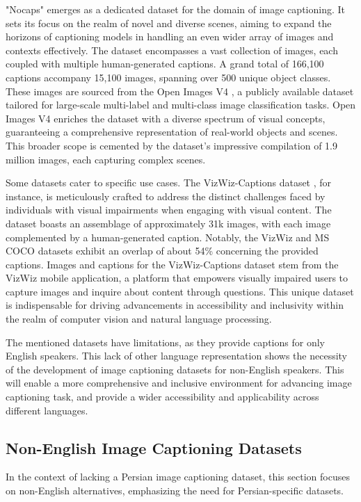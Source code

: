 \documentclass[runningheads]{llncs}
\begin{document}
"Nocaps" \cite{Nocaps} emerges as a dedicated dataset for the domain of image captioning. It sets its focus on the realm of novel and diverse scenes, aiming to expand the horizons of captioning models in handling an even wider array of images and contexts effectively. The dataset encompasses a vast collection of images, each coupled with multiple human-generated captions. A grand total of 166,100 captions accompany 15,100 images, spanning over 500 unique object classes. These images are sourced from the Open Images V4 \cite{Openimages}, a publicly available dataset tailored for large-scale multi-label and multi-class image classification tasks. Open Images V4 enriches the dataset with a diverse spectrum of visual concepts, guaranteeing a comprehensive representation of real-world objects and scenes. This broader scope is cemented by the dataset's impressive compilation of 1.9 million images, each capturing complex scenes.

Some datasets cater to specific use cases. The VizWiz-Captions dataset \cite{VizWiz}, for instance, is meticulously crafted to address the distinct challenges faced by individuals with visual impairments when engaging with visual content. The dataset boasts an assemblage of approximately 31k images, with each image complemented by a human-generated caption. Notably, the VizWiz and MS COCO datasets exhibit an overlap of about 54\% concerning the provided captions. Images and captions for the VizWiz-Captions dataset stem from the VizWiz mobile application, a platform that empowers visually impaired users to capture images and inquire about content through questions. This unique dataset is indispensable for driving advancements in accessibility and inclusivity within the realm of computer vision and natural language processing.

The mentioned datasets have limitations, as they provide captions for only English speakers. This lack of other language representation shows the necessity of the development of image captioning datasets for non-English speakers. This will enable a more comprehensive and inclusive environment for advancing image captioning task, and provide a wider accessibility and applicability across different languages.

\subsection{Non-English Image Captioning Datasets}
In the context of lacking a Persian image captioning dataset, this section focuses on non-English alternatives, emphasizing the need for Persian-specific datasets.
\end{document}
